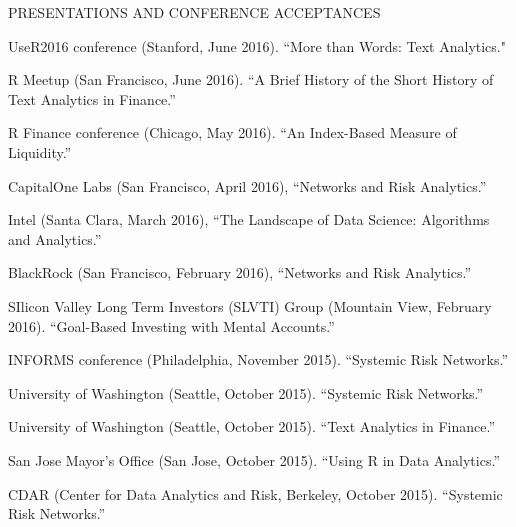 \documentclass{article}
\begin{document}
\begin{description} 
\item[PRESENTATIONS AND CONFERENCE ACCEPTANCES] \mbox{}
\end{description}

\begin{etaremune}
\setlength\itemsep{-0.4em}

{\small


\item UseR2016 conference (Stanford, June 2016). ``More than Words: Text Analytics."

\item R Meetup (San Francisco, June 2016). ``A Brief History of the Short History of Text Analytics in Finance.''

\item R Finance conference (Chicago, May 2016). ``An Index-Based Measure of Liquidity.''

\item CapitalOne Labs (San Francisco, April 2016), ``Networks and Risk Analytics.''

\item Intel (Santa Clara, March 2016), ``The Landscape of Data Science: Algorithms and Analytics.''

\item BlackRock (San Francisco, February 2016), ``Networks and Risk Analytics.''

\item SIlicon Valley Long Term Investors (SLVTI) Group (Mountain View, February 2016). ``Goal-Based Investing with Mental Accounts.''


\item INFORMS conference (Philadelphia, November 2015). ``Systemic Risk Networks.''

\item University of Washington (Seattle, October 2015). ``Systemic Risk Networks.''

\item University of Washington (Seattle, October 2015). ``Text Analytics in Finance.''

\item San Jose Mayor's Office (San Jose, October 2015). ``Using R in Data Analytics.''

\item CDAR (Center for Data Analytics and Risk, Berkeley, October 2015). ``Systemic Risk Networks.''

}
\end{etaremune}
\end{document}
